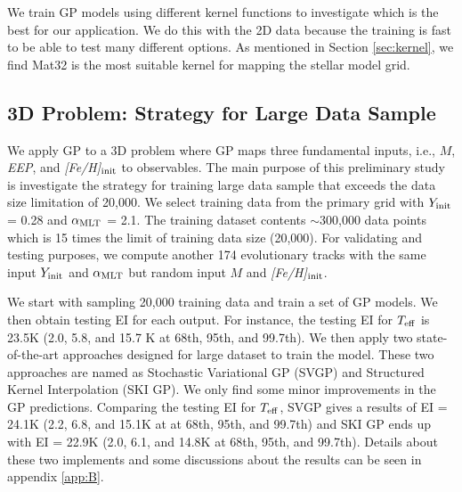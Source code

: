 We train GP models using different kernel functions to investigate which is the best for our application. We do this with the 2D data because the training is fast to be able to test many different options. As mentioned in Section \ref{sec:kernel}, we find Mat32 is the most suitable kernel for mapping the stellar model grid.  


\subsection{3D Problem: Strategy for Large Data Sample}\label{sec:3d}

We apply GP to a 3D problem where GP maps three fundamental inputs, i.e., $M$, {\it EEP}, and {\it [Fe/H]}$_{\rm init}$ to observables. The main purpose of this preliminary study is investigate the strategy for training large data sample that exceeds the data size limitation of 20,000.
%
We select training data from the primary grid with $Y_{\rm init}$ = 0.28 and $\alpha_{\rm MLT}$ = 2.1. The training dataset contents $\sim$300,000 data points which is 15 times the limit of training data size (20,000).  For validating and testing purposes, we compute another 174 evolutionary tracks with the same input $Y_{\rm init}$ and $\alpha_{\rm MLT}$ but random input $M$ and {\it [Fe/H]}$_{\rm init}$. 

We start with sampling 20,000 training data and train a set of GP models. We then obtain testing EI for each output.  For instance, the testing EI for $T_{\rm eff}$ is 23.5K (2.0, 5.8, and 15.7 K at 68th, 95th, and 99.7th). 
%
We then apply two state-of-the-art approaches designed for large dataset to train the model. These two approaches are named as Stochastic Variational GP (SVGP) and Structured Kernel Interpolation (SKI GP). We only find some minor improvements in the GP predictions. Comparing the testing EI for $T_{\rm eff}$, SVGP gives a results of EI = 24.1K (2.2, 6.8, and 15.1K at  at 68th, 95th, and 99.7th) and SKI GP ends up with  EI = 22.9K (2.0, 6.1, and 14.8K at 68th, 95th, and 99.7th). Details about these two implements and some discussions about the results can be seen in appendix \ref{app:B}. 
%
 

